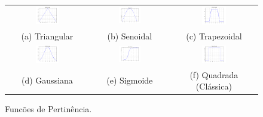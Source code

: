 \begin{figure}[H]
	\centering
\begin{tabular}{ccc}
	\includegraphics[width=0.3\textwidth,keepaspectratio]{img/pert_triang.png} &
	\includegraphics[width=0.3\textwidth,keepaspectratio]{img/pert_sen.png} &
	\includegraphics[width=0.3\textwidth,keepaspectratio]{img/pert_trap.png} \\
	(a) Triangular &
	(b) Senoidal &
	(c) Trapezoidal \\
	\includegraphics[width=0.3\textwidth,keepaspectratio]{img/pert_gaus.png} &
	\includegraphics[width=0.3\textwidth,keepaspectratio]{img/pert_sig.png} &
	\includegraphics[width=0.3\textwidth,keepaspectratio]{img/pert_square.png} \\
	(d) Gaussiana &
	(e) Sigmoide &
	(f) Quadrada (Clássica)
\end{tabular}
	\caption{\label{figPert}Funcões de Pertinência.}
\end{figure}

